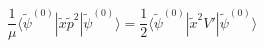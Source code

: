 \begin{equation}
\frac{1}{\mu}\langle \tilde\psi^{(0)}|\tilde  x \tilde p^2
|\tilde\psi^{(0)}\rangle
=\frac{1}{2}\langle \tilde\psi^{(0)}|\tilde  x^2 V'
|\tilde\psi^{(0)}\rangle
\nonumber
\end{equation}

